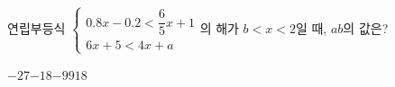 연립부등식 $\begin{cases} 0.8x-0.2<\dfrac{6}{5}x+1 \\ 6x+5<4x+a \end{cases}$의 해가 $b<x<2$일 때, $ab$의 값은? 
\begin{choices32}{$-27$}{$-18$}{$-9$}{$9$}{$18$}\end{choices32}
